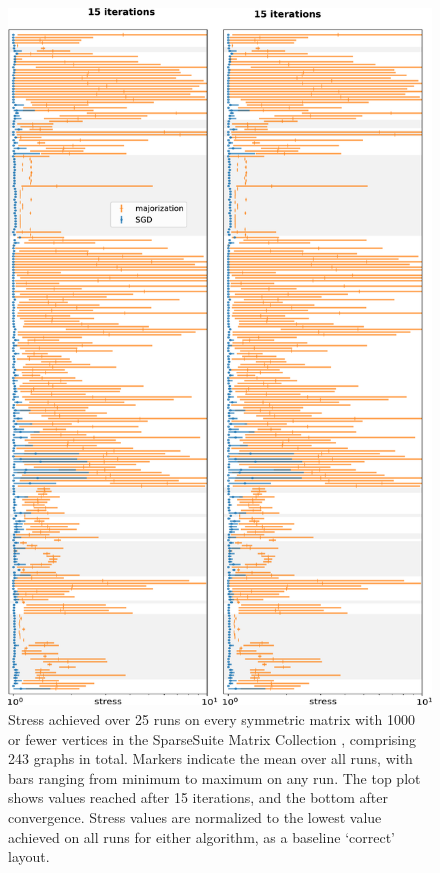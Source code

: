 \begin{figure}
  \centering
  \includegraphics[height=.8\textheight]{stress/systematic.pdf}
  \caption[A systematic comparison against majorization over 243 graphs]{Stress achieved over 25 runs on every symmetric matrix with 1000 or fewer vertices in the SparseSuite Matrix Collection \cite{Davis2011}, comprising 243 graphs in total. Markers indicate the mean over all runs, with bars ranging from minimum to maximum on any run.
  The top plot shows values reached after 15 iterations, and the bottom after convergence.
  Stress values are normalized to the lowest value achieved on all runs for either algorithm, as a baseline `correct' layout.
}
\end{figure}
